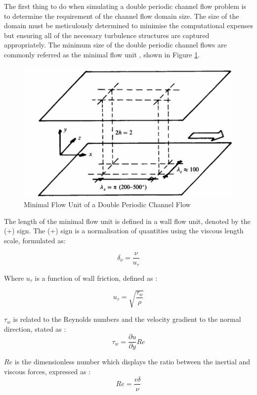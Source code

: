 The first thing to do when simulating a double periodic channel flow problem is to determine the requirement of the channel flow domain size. The size of the domain must be meticulously determined to minimise the computational expenses but ensuring all of the necessary turbulence structures are captured appropriately. The minimum size of the double periodic channel flows are commonly referred as the minimal flow unit \cite{Jimenez1991}, shown in Figure \ref{fig:jimenezmfu}.

\begin{figure}[ht]
	\centering
	\includegraphics[width=0.6\linewidth]{Figures/JimenezMFU}
	\caption{Minimal Flow Unit of a Double Periodic Channel Flow~\cite{Jimenez1991}}
	\label{fig:jimenezmfu}
\end{figure}

\pagebreak
The length of the minimal flow unit is defined in a wall flow unit, denoted by the (+) sign. The (+) sign is a normalisation of quantities using the viscous length scale, formulated as:

\begin{equation}
	\delta_\nu = \frac{\nu}{u_\tau}
\end{equation}

Where $u_\tau$ is a function of wall friction, defined as \cite{Pope2000}:

\begin{equation}
	u_\tau = \sqrt{\frac{\tau_w}{\rho}}
\end{equation}

$\tau_w$ is related to the Reynolds numbers and the velocity gradient to the normal direction, stated as \cite{Daniel2017}:
\begin{equation}
	\tau_{w} = \frac{\partial u}{\partial y} Re
\end{equation}

$Re$ is the dimensionless number which displays the ratio between the inertial and viscous forces, expressed as \cite{NASA_Re}:
\begin{equation}
	Re = \frac{v \delta}{\nu}
\end{equation}

